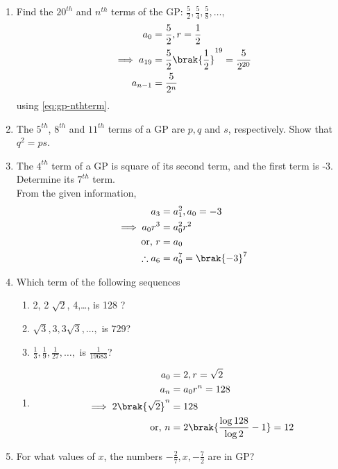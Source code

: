 \begin{enumerate}[label=\thesubsection.\arabic*.,ref=\thesubsection.\theenumi]
\item Find the $20^{th}$ and $n^{th}$ terms of the GP: $\frac{5}{2}, \frac{5}{4}, \frac{5}{8},\dots, $
	\\
	\solution
\begin{align}
	a_0 &= \frac{5}{2}, r = \frac{1}{2}
	\\
	\implies a_{19} &=\frac{5}{2}\brak{\frac{1}{2}}^{19}=\frac{5}{2^{20}}
	\\
	a_{n-1} &= \frac{5}{2^n}
\end{align}
using
	\eqref{eq:gp-nthterm}.
\item The $5^{th}$, $8^{th}$ and $11^{th}$ terms of a GP  are $p, q$ and $s$, respectively. Show that 
$q^2 = ps$.
\item The $4^{th}$ term of a GP  is square of its second term, and the first term is -3. Determine its $7^{th}$ term.
	\\
	\solution  From the given information, 
\begin{align}
	a_3 &= a_1^2, a_0 = -3
	\\
	\implies a_0r^3&= a_0^2r^2
	\\
	\text{or, } r &= a_0
	\\
	\therefore a_6 &= a_0^7= \brak{-3}^7
\end{align}
\item Which term of the following sequences
\begin{enumerate}
	\item 2, 2 $\sqrt{2}$, 4,\dots,  is 128 ?
	\item $\sqrt{3}, 3, 3\sqrt{3},\dots,$  is 729?
	\item $\frac{1}{3}, \frac{1}{9}, \frac{1}{27}, \dots,$  is $\frac{1}{19683}$?
\end{enumerate}
	\solution
\begin{enumerate}
	\item 
\begin{align}
	a_0&= 2, r = \sqrt{2}
	\\
	a_n &= a_0r^n = 128
	\\
		\implies 2\brak{\sqrt{2}}^n &= 128
		\\
		\text{or, } n &= 2\brak{\frac{\log 128}{\log 2}-1}=12
\end{align}
\end{enumerate}
\item For what values of $x$, the numbers $-\frac{2}{7}, x, -\frac{7}{2}$ are in GP?
\\

\end{enumerate}
